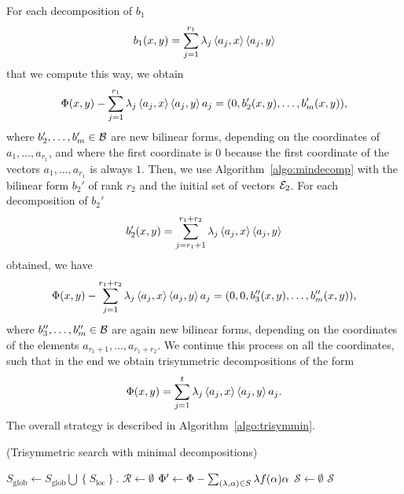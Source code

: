 For each decomposition of $b_1$
\[
  b_1(x, y) = \sum_{j=1}^{r_1}\lambda_j\left\langle a_j,x\right\rangle\left\langle a_j,y\right\rangle
\]
that we compute this way, we obtain
\[
  \Phi(x, y) - \sum_{j=1}^{r_1}\lambda_j\left\langle a_j,x\right\rangle\left\langle a_j,y\right\rangle a_j = (0, b_2'(x,
  y), \dots, b_m'(x, y)),
\]
where $b_2', \dots, b_m'\in\mathcal{B}$ are new bilinear forms, depending on the coordinates
of $a_1, \dots, a_{r_1}$, and where the first coordinate is $0$ because the
first coordinate of the vectors $a_1, \dots, a_{r_1}$ is always $1$. Then, we
use Algorithm~\ref{algo:mindecomp} with the bilinear form $b_2'$ of rank $r_2$ and the initial
set of vectors $\mathcal{E}_2$. For each decomposition of $b_2'$
\[
  b_2'(x, y) = \sum_{j=r_{1}+1}^{r_1+r_2}\lambda_j\left\langle a_j,x\right\rangle\left\langle a_j,y\right\rangle
\]
obtained, we have
\[
  \Phi(x, y) - \sum_{j=1}^{r_1+r_2}\lambda_j\left\langle a_j,x\right\rangle\left\langle a_j,y\right\rangle a_j = (0, 0,
  b_3''(x, y), \dots, b_m''(x, y)),
\]
where $b_3'', \dots, b_m''\in\mathcal{B}$ are again new bilinear forms, depending on the
coordinates of the elements $a_{r_1+1}, \dots, a_{r_1+r_2}$. We continue this
process on all the coordinates, such that in the end we obtain trisymmetric
decompositions of the form
\[
  \Phi(x, y) = \sum_{j=1}^t\lambda_j\left\langle a_j,x\right\rangle\left\langle a_j,y\right\rangle a_j.
\]
The overall strategy is described in Algorithm~\ref{algo:trisymmin}.
\begin{algorithm}
  \caption{(Trisymmetric search with minimal
  decompositions)}\label{algo:trisymmin}
  \begin{algorithmic}[1]

      \State $S_\text{glob}\gets S_\text{glob}\bigcup \left\{S_\text{loc}\right\}$.
        \State $\mathcal R\gets\emptyset$
        \State {}
        \State $\Phi'\gets\Phi-\sum_{(\lambda, \alpha)\in
        S}\lambda f(\alpha)\alpha$
        \State {}
        \EndFor
      \EndIf
    \EndProcedure
    \State $\mathcal S\gets\emptyset$
    \State {}
    \State \Return $\mathcal S$
  \end{algorithmic}
\end{algorithm}

